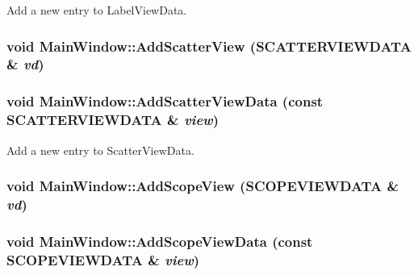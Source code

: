 Add a new entry to LabelViewData. 

\hypertarget{class_main_window_d7843a6272ce3e6ca47648a2ea3916c0}{
\subsubsection[{AddScatterView}]{\setlength{\rightskip}{0pt plus 5cm}void MainWindow::AddScatterView ({\bf SCATTERVIEWDATA} \& {\em vd})}}
\label{class_main_window_d7843a6272ce3e6ca47648a2ea3916c0}


\hypertarget{class_main_window_b3202816e13839cd511ca279dd6f6074}{
\subsubsection[{AddScatterViewData}]{\setlength{\rightskip}{0pt plus 5cm}void MainWindow::AddScatterViewData (const {\bf SCATTERVIEWDATA} \& {\em view})}}
\label{class_main_window_b3202816e13839cd511ca279dd6f6074}


Add a new entry to ScatterViewData. 

\hypertarget{class_main_window_ea626ab95c3904f91e091fe62d900fe6}{
\subsubsection[{AddScopeView}]{\setlength{\rightskip}{0pt plus 5cm}void MainWindow::AddScopeView ({\bf SCOPEVIEWDATA} \& {\em vd})}}
\label{class_main_window_ea626ab95c3904f91e091fe62d900fe6}


\hypertarget{class_main_window_cfd558a4ee1c1753d55100fe1fa7a0ab}{
\subsubsection[{AddScopeViewData}]{\setlength{\rightskip}{0pt plus 5cm}void MainWindow::AddScopeViewData (const {\bf SCOPEVIEWDATA} \& {\em view})}}
\label{class_main_window_cfd558a4ee1c1753d55100fe1fa7a0ab}


